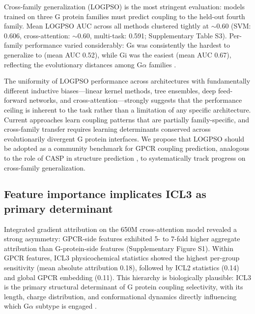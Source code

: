 \documentclass[11pt,a4paper]{article}
\begin{document}
Cross-family generalization (LOGPSO) is the most stringent evaluation: models trained on three G protein families must predict coupling to the held-out fourth family. Mean LOGPSO AUC across all methods clustered tightly at $\sim$0.60 (SVM: 0.606, cross-attention: $\sim$0.60, multi-task: 0.591; Supplementary Table S3). Per-family performance varied considerably: Gs was consistently the hardest to generalize to (mean AUC 0.52), while Gi was the easiest (mean AUC 0.67), reflecting the evolutionary distances among G$\alpha$ families \cite{wettschureck2005mammalian}.

The uniformity of LOGPSO performance across architectures with fundamentally different inductive biases---linear kernel methods, tree ensembles, deep feed-forward networks, and cross-attention---strongly suggests that the performance ceiling is inherent to the task rather than a limitation of any specific architecture. Current approaches learn coupling patterns that are partially family-specific, and cross-family transfer requires learning determinants conserved across evolutionarily divergent G protein interfaces. We propose that LOGPSO should be adopted as a community benchmark for GPCR coupling prediction, analogous to the role of CASP in structure prediction \cite{kryshtafovych2023casp15}, to systematically track progress on cross-family generalization.

\subsection{Feature importance implicates ICL3 as primary determinant}

Integrated gradient attribution on the 650M cross-attention model revealed a strong asymmetry: GPCR-side features exhibited 5- to 7-fold higher aggregate attribution than G-protein-side features (Supplementary Figure S1). Within GPCR features, ICL3 physicochemical statistics showed the highest per-group sensitivity (mean absolute attribution 0.18), followed by ICL2 statistics (0.14) and global GPCR embedding (0.11). This hierarchy is biologically plausible: ICL3 is the primary structural determinant of G protein coupling selectivity, with its length, charge distribution, and conformational dynamics directly influencing which G$\alpha$ subtype is engaged \cite{flock2023selectivity, rasmussen2011crystal}.

\end{document}
